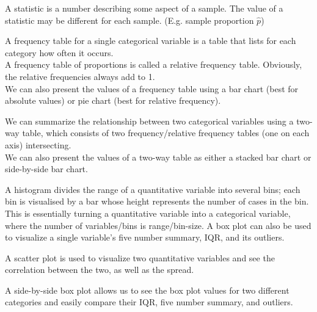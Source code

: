 \documentclass[12pt]{article}
\begin{document}
\begin{tcolorbox}[title=Statistic]
    A statistic is a number describing some aspect of a sample. The value of a statistic may be different for each sample. (E.g. sample proportion $\hat p$)
\end{tcolorbox}

\begin{tcolorbox}[title=Visualising Variables]
    \begin{tcolorbox}[title=Visualising One Categorical Variable]
        A frequency table for a single categorical variable is a table that lists for each category how often it occurs.\\
        A frequency table of proportions is called a relative frequency table.
        Obviously, the relative frequencies always add to 1.\\
        We can also present the values of a frequency table using a bar chart (best for absolute values) or pie chart (best for relative frequency).
    \end{tcolorbox}
    \begin{tcolorbox}[title=Visualising Two Categorical Variables]
        We can summarize the relationship between two categorical variables using a two-way table, which consists of two frequency/relative frequency tables (one on each axis) intersecting.\\
        We can also present the values of a two-way table as either a stacked bar chart or side-by-side bar chart.
    \end{tcolorbox}
    \begin{tcolorbox}[title=Visualising One Quantitative Variable]
        A histogram divides the range of a quantitative variable into several bins; each bin is visualised by a bar whose height represents the number of cases in the bin. This is essentially turning a quantitative variable into a categorical variable, where the number of variables/bins is range/bin-size.
        A box plot can also be used to visualize a single variable's five number summary, IQR, and its outliers.
    \end{tcolorbox}
    \begin{tcolorbox}[title=Visualising Two Quantitative Variables]
        A scatter plot is used to visualize two quantitative variables and see the correlation between the two, as well as the spread.
    \end{tcolorbox}
    \begin{tcolorbox}[title=One Categorical \& One Quantitative]
        A side-by-side box plot allows us to see the box plot values for two different categories and easily compare their IQR, five number summary, and outliers.
    \end{tcolorbox}
\end{tcolorbox}
\end{document}
